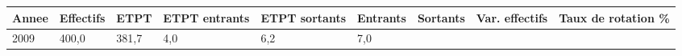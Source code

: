\begin{longtable}[]{@{}lllllllll@{}}
\toprule
\begin{minipage}[b]{0.05\columnwidth}\raggedright
Annee\strut
\end{minipage} & \begin{minipage}[b]{0.08\columnwidth}\raggedright
Effectifs\strut
\end{minipage} & \begin{minipage}[b]{0.05\columnwidth}\raggedright
ETPT\strut
\end{minipage} & \begin{minipage}[b]{0.10\columnwidth}\raggedright
ETPT entrants\strut
\end{minipage} & \begin{minipage}[b]{0.10\columnwidth}\raggedright
ETPT sortants\strut
\end{minipage} & \begin{minipage}[b]{0.07\columnwidth}\raggedright
Entrants\strut
\end{minipage} & \begin{minipage}[b]{0.07\columnwidth}\raggedright
Sortants\strut
\end{minipage} & \begin{minipage}[b]{0.11\columnwidth}\raggedright
Var. effectifs\strut
\end{minipage} & \begin{minipage}[b]{0.14\columnwidth}\raggedright
Taux de rotation \%\strut
\end{minipage}\tabularnewline
\midrule
\endhead
\begin{minipage}[t]{0.05\columnwidth}\raggedright
2009\strut
\end{minipage} & \begin{minipage}[t]{0.08\columnwidth}\raggedright
400,0\strut
\end{minipage} & \begin{minipage}[t]{0.05\columnwidth}\raggedright
381,7\strut
\end{minipage} & \begin{minipage}[t]{0.10\columnwidth}\raggedright
4,0\strut
\end{minipage} & \begin{minipage}[t]{0.10\columnwidth}\raggedright
6,2\strut
\end{minipage} & \begin{minipage}[t]{0.07\columnwidth}\raggedright
7,0\strut
\end{minipage} & \begin{minipage}[t]{0.07\columnwidth}\raggedright

\end{minipage}
\end{longtable}
